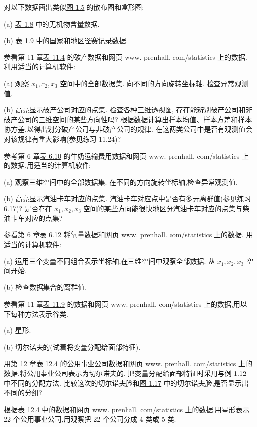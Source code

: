 
 对以下数据画出类似\hyperref[fig:1.5]{图 1.5} 的散布图和盒形图:

(a) \hyperref[tab:1.8]{表 1.8} 中的无机物含量数据.

(b) \hyperref[tab:1.9]{表 1.9} 中的国家和地区径赛记录数据.

 参看第 11 章\hyperref[tab:11.4]{表 11.4} 的破产数据和网页 www. prenhall. com/statistics 上的数据. 利用适当的计算机软件:

(a) 观察 $x_1,x_2,x_3$ 空间中的全部数据集. 向不同的方向旋转坐标轴. 检查异常观测值.

(b) 高亮显示破产公司对应的点集. 检查各种三维透视图, 存在能辨别破产公司和非破产公司的三维空间的某些方向性吗? 根据数据计算出样本均值、样本方差和样本协方差,以得出划分破产公司与非破产公司的规律. 在这两类公司中是否有观测值会对该规律有重大影响(参见练习 11.24)?

 参考第 6 章\hyperref[tab:6.10]{表 6.10} 的牛奶运输费用数据和网页 www. prenhall. com/statistics 上的数据,用适当的计算机软件:

(a) 观察三维空间中的全部数据集. 在不同的方向旋转坐标轴,检查异常观测值.

(b) 高亮显示汽油卡车对应的点集. 汽油卡车对应点中是否有多元离群值(参见练习 6.17)? 是否存在 $x_1,x_2,x_3$ 空间的某些方向能很快地区分汽油卡车对应的点集与柴油卡车对应的点集?

 参看第 6 章\hyperref[tab:6.12]{表 6.12} 耗氧量数据和网页 www. prenhall. com/statistics 上的数据. 用适当的计算机软件:

(a) 运用三个变量不同组合表示坐标轴,在三维空间中观察全部数据. 从 $x_1,x_2,x_3$ 空间开始.

(b) 检查数据集合的离群值.

 参看第 11 章\hyperref[tab:11.9]{表 11.9} 的数据和网页 www. prenhall. com/statistics 上的数据,用以下每种方法表示谷类.

(a) 星形.

(b) 切尔诺夫的(试着将变量分配给面部特征).

 用第 12 章\hyperref[tab:12.4]{表 12.4} 的公用事业公司数据和网页 www. prenhall. com/statistics 上的数据,将公用事业公司表示为切尔诺夫的. 把变量分配给面部特征时采用与例 1.12 中不同的分配方法. 比较这次的切尔诺夫脸和\hyperref[fig:1.17]{图 1.17} 中的切尔诺夫脸,是否显示出不同的分组?

 根据\hyperref[tab:12.4]{表 12.4} 中的数据和网页 www. prenhall. com/statistics 上的数据,用星形表示 22 个公用事业公司,用观察把 22 个公司分成 4 类或 5 类.

